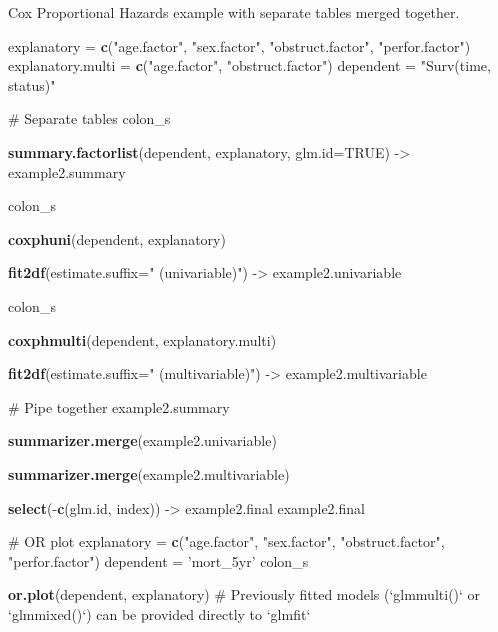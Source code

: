 \documentclass[
]{article}
\newenvironment{Shaded}{\begin{snugshade}}{\end{snugshade}}
\newcommand{\CommentTok}[1]{\textcolor[rgb]{0.54,0.53,0.53}{#1}}
\newcommand{\DataTypeTok}[1]{\textcolor[rgb]{0.00,0.34,0.68}{#1}}
\newcommand{\KeywordTok}[1]{\textcolor[rgb]{0.12,0.11,0.11}{\textbf{#1}}}
\newcommand{\NormalTok}[1]{\textcolor[rgb]{0.12,0.11,0.11}{#1}}
\newcommand{\OperatorTok}[1]{\textcolor[rgb]{0.12,0.11,0.11}{#1}}
\newcommand{\OtherTok}[1]{\textcolor[rgb]{0.00,0.43,0.16}{#1}}
\newcommand{\StringTok}[1]{\textcolor[rgb]{0.75,0.01,0.01}{#1}}
\begin{document}
\begin{Shaded}
\begin{Highlighting}[]
{{{{{{{{{{{{{{{\NormalTok{Cox Proportional Hazards example with separate tables merged together.}

\NormalTok{explanatory =}\StringTok{ }\KeywordTok{c}\NormalTok{(}\StringTok{"age.factor"}\NormalTok{, }\StringTok{"sex.factor"}\NormalTok{, }\StringTok{"obstruct.factor"}\NormalTok{, }\StringTok{"perfor.factor"}\NormalTok{)}
\NormalTok{explanatory.multi =}\StringTok{ }\KeywordTok{c}\NormalTok{(}\StringTok{"age.factor"}\NormalTok{, }\StringTok{"obstruct.factor"}\NormalTok{)}
\NormalTok{dependent =}\StringTok{ "Surv(time, status)"}

\CommentTok{# Separate tables}
\NormalTok{colon_s }\OperatorTok{%>%}
\StringTok{    }\KeywordTok{summary.factorlist}\NormalTok{(dependent, explanatory, }\DataTypeTok{glm.id=}\OtherTok{TRUE}\NormalTok{) ->}\StringTok{ }\NormalTok{example2.summary}

\NormalTok{colon_s }\OperatorTok{%>%}
\StringTok{    }\KeywordTok{coxphuni}\NormalTok{(dependent, explanatory) }\OperatorTok{%>%}
\StringTok{    }\KeywordTok{fit2df}\NormalTok{(}\DataTypeTok{estimate.suffix=}\StringTok{" (univariable)"}\NormalTok{) ->}\StringTok{ }\NormalTok{example2.univariable}

\NormalTok{colon_s }\OperatorTok{%>%}
\StringTok{  }\KeywordTok{coxphmulti}\NormalTok{(dependent, explanatory.multi) }\OperatorTok{%>%}
\StringTok{  }\KeywordTok{fit2df}\NormalTok{(}\DataTypeTok{estimate.suffix=}\StringTok{" (multivariable)"}\NormalTok{) ->}\StringTok{ }\NormalTok{example2.multivariable}

\CommentTok{# Pipe together}
\NormalTok{example2.summary }\OperatorTok{%>%}
\StringTok{    }\KeywordTok{summarizer.merge}\NormalTok{(example2.univariable) }\OperatorTok{%>%}
\StringTok{    }\KeywordTok{summarizer.merge}\NormalTok{(example2.multivariable) }\OperatorTok{%>%}
\StringTok{    }\KeywordTok{select}\NormalTok{(}\OperatorTok{-}\KeywordTok{c}\NormalTok{(glm.id, index)) ->}\StringTok{ }\NormalTok{example2.final}
\NormalTok{example2.final}







\CommentTok{# OR plot}
\NormalTok{explanatory =}\StringTok{ }\KeywordTok{c}\NormalTok{(}\StringTok{"age.factor"}\NormalTok{, }\StringTok{"sex.factor"}\NormalTok{, }\StringTok{"obstruct.factor"}\NormalTok{, }\StringTok{"perfor.factor"}\NormalTok{)}
\NormalTok{dependent =}\StringTok{ 'mort_5yr'}
\NormalTok{colon_s }\OperatorTok{%>%}
\StringTok{  }\KeywordTok{or.plot}\NormalTok{(dependent, explanatory)}
\CommentTok{# Previously fitted models (`glmmulti()` or `glmmixed()`) can be provided directly to `glmfit`}

}}}}}}}}}}}}}}}}}}}}}}}}
\end{Highlighting}
\end{Shaded}
\end{document}
